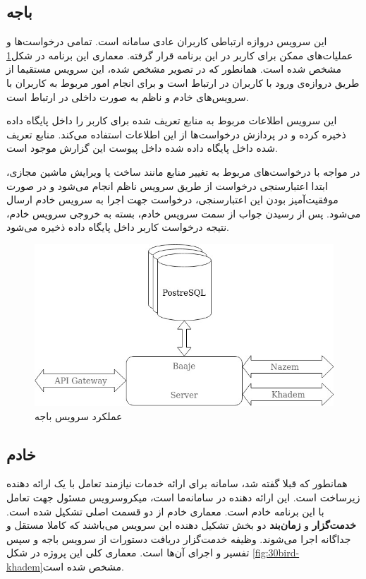 \subsection{باجه}
این سرویس دروازه ارتباطی کاربران عادی سامانه است. تمامی درخواست‌ها و عملیات‌های ممکن برای کاربر در این برنامه قرار گرفته. معماری این برنامه در شکل\ref{fig:30bird-baaje} مشخص شده است. همانطور که در تصویر مشخص شده، این سرویس مستقیما از طریق ‌دروازه‌ی ورود با کاربران در ارتباط است و برای انجام امور مربوط به کاربران با سرویس‌های خادم و ناظم به صورت داخلی در ارتباط است.


این سرویس اطلاعات مربوط به منابع تعریف شده برای کاربر را داخل پایگاه داده ذخیره کرده و در پردازش درخواست‌ها از این اطلاعات استفاده می‌کند. منابع تعریف شده داخل پایگاه داده شده داخل پیوست این گزارش موجود است.

در مواجه با درخواست‌های مربوط به تغییر منابع مانند ساخت یا ویرایش ماشین مجازی، ابتدا اعتبارسنجی درخواست از طریق سرویس ناظم انجام می‌شود و در صورت موفقیت‌آمیز بودن این اعتبارسنجی، درخواست جهت اجرا به سرویس خادم ارسال می‌شود. پس از رسیدن جواب از سمت سرویس خادم، بسته به خروجی سرویس خادم، نتیجه درخواست کاربر داخل پایگاه داده ذخیره می‌شود.
\begin{figure}
	\centering
	\includegraphics[scale=0.5]{figures/30bird-baaje.jpg}
	\caption{عملکرد سرویس باجه}
	\label{fig:30bird-baaje}
\end{figure}


\subsection{خادم}
همانطور که قبلا گفته شد، سامانه برای ارائه خدمات  نیازمند تعامل با یک ارائه دهنده زیرساخت است. این ارائه دهنده در سامانه‌ما  است، میکروسرویس مسئول جهت تعامل با این برنامه خادم است. معماری خادم از دو قسمت اصلی تشکیل شده است. \textbf{خدمت‌گزار} و \textbf{زمان‌بند} دو بخش تشکیل دهنده این سرویس می‌باشند که کاملا مستقل و جداگانه اجرا می‌شوند. وظیفه خدمت‌گزار دریافت دستورات از سرویس باجه و سپس تفسیر و اجرای آن‌‌ها است. معماری کلی این پروژه در شکل \ref{fig:30bird-khadem}مشخص شده است.

